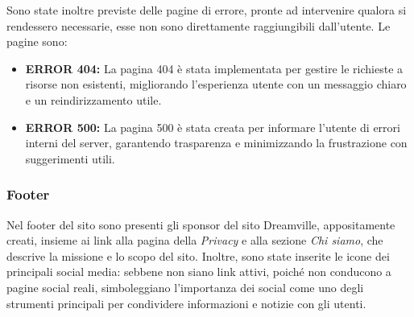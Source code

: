 Sono state inoltre previste delle pagine di errore, pronte ad intervenire qualora si rendessero necessarie, esse non sono direttamente raggiungibili dall'utente.
Le pagine sono:
\begin{itemize}
    \item \textbf{ERROR 404:} La pagina 404 è stata implementata per gestire le richieste a risorse non esistenti, migliorando l'esperienza utente con un messaggio chiaro e un reindirizzamento utile.
    \item \textbf{ERROR 500:} La pagina 500 è stata creata per informare l'utente di errori interni del server, garantendo trasparenza e minimizzando la frustrazione con suggerimenti utili.
\end{itemize}
\subsubsection{Footer}
Nel footer del sito sono presenti gli sponsor del sito Dreamville, appositamente creati, insieme ai link alla pagina della \textit{Privacy} e alla sezione \textit{Chi siamo}, che descrive la missione e lo scopo del sito. Inoltre, sono state inserite le icone dei principali social media: sebbene non siano link attivi, poiché non conducono a pagine social reali, simboleggiano l'importanza dei social come uno degli strumenti principali per condividere informazioni e notizie con gli utenti.

